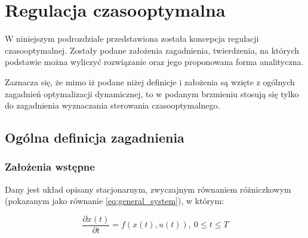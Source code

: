 \section{Regulacja czasooptymalna}
\label{sec:toc}

W niniejszym podrozdziale przedstawiona została koncepcja regulacji czasooptymalnej. Zostały podane założenia zagadnienia, twierdzenia, na których podstawie można wyliczyć rozwiązanie oraz jego proponowana forma analityczna.

Zaznacza się, że mimo iż podane niżej definicje i założenia są wzięte z ogólnych zagadnień optymalizacji dynamicznej, to w podanym brzmieniu stosują się tylko do zagadnienia wyznaczania sterowania czasooptymalnego.

\subsection{Ogólna definicja zagadnienia}
\label{sub:toc-def}

\subsubsection{Założenia wstępne}
\label{sub:toc-def-intro}
Dany jest układ opisany stacjonarnym, zwyczajnym równaniem różniczkowym (pokazanym jako równanie \ref{eq:general_system}), w którym:

\begin{equation}\label{eq:general_system}
    \frac{\partial x(t)}{\partial t} = f(x(t), u(t)), ~ 0 \leq t \leq T
\end{equation}


